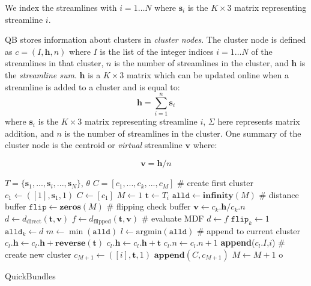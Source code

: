 \documentclass{bioinfo}
\begin{document}
\begin{methods}
We index the streamlines with $i = 1 \dots N$ where $\mathbf{s}_{i}$ is
the $K\times3$ matrix representing streamline $i$.

QB stores information about clusters in \emph{cluster nodes}.  The
cluster node is defined as $c=(I,\mathbf{h},n)$ where $I$ is the list of
the integer indices $i = 1 \dots N$ of the streamlines in that cluster,
$n$ is the number of streamlines in the cluster, and $\mathbf{h}$ is the
\emph{streamline sum}. $\mathbf{h}$ is a $K \times3$ matrix which can be
updated online when a streamline is added to a cluster and is equal to:
\begin{equation}
  \mathbf{h}=\sum_{i=1}^{n}\mathbf{s}_{i}
\end{equation} 
where $\mathbf{s}_{i}$ is the $K\times3$ matrix representing streamline $i$,
$\Sigma$ here represents matrix addition, and $n$ is the number of
streamlines in the cluster. One summary of the cluster node is the centroid or
\emph{virtual} streamline $\mathbf{v}$ where:

\begin{equation}
  \mathbf{v} = \mathbf{h} / n
\end{equation}

\begin{algorithm}[h]
\begin{algorithmic}
\REQUIRE $T=\{\mathbf{s}_{1},...,\mathbf{s}_{i},...,\mathbf{s}_{N}\}$, $\theta$
\ENSURE $C=[c_{1},...,c_{k},...,c_{M}]$ 
\STATE \# create first cluster
\STATE $c_{1} \leftarrow ([1],\mathbf{s}_{1},1)$
\STATE $C\leftarrow[c_{1}]$
\STATE $M\leftarrow1$ 
	\STATE $\textbf{t}\leftarrow T_{i}$
	\STATE $\texttt{alld}\leftarrow\textbf{infinity}(M)$ \# distance buffer
	\STATE $\texttt{flip}\leftarrow\textbf{zeros}(M)$ \# flipping check buffer
		\STATE $\mathbf{v}\leftarrow c_{k}.\mathbf{h}/c_{k}.n$
		\STATE $d\leftarrow d_{\textrm{direct}}(\mathbf{t},\mathbf{v})$
		\STATE $f\leftarrow d_{\textrm{flipped}}(\mathbf{t},\mathbf{v})$
	\STATE \# evaluate MDF
		\STATE $d \leftarrow f$
		\STATE $\texttt{flip}_{k} \leftarrow 1$
	\ENDIF
	\STATE $\texttt{alld}_{k} \leftarrow d$
	\ENDFOR
\STATE $m\leftarrow \min(\texttt{alld})$
\STATE $l\leftarrow \mathrm{arg min}(\texttt{alld})$
\STATE \# append to current cluster
		\STATE $c_{l}.\mathbf{h} \leftarrow c_{l}.\mathbf{h} + \textbf{reverse}(\textbf{t})$
	\ELSE
		\STATE $c_{l}.\mathbf{h} \leftarrow c_{l}.\mathbf{h} + \textbf{t}$
	\ENDIF
	\STATE $c_{l}.n \leftarrow c_{l}.n + 1$
	\STATE \textbf{append}($c_{l}.I$,$i$)
\ELSE 
\STATE \# create new cluster
        \STATE $c_{M+1} \leftarrow ([i],\mathbf{t},1)$
        \STATE $\mathbf{append}(C,c_{M+1})$
	\STATE $M\leftarrow M+1$
\ENDIF
o\ENDFOR 
\end{algorithmic}
\caption{QuickBundles}
\label{Alg:QuickBundles}
\end{algorithm}


\end{methods}
\end{document}
